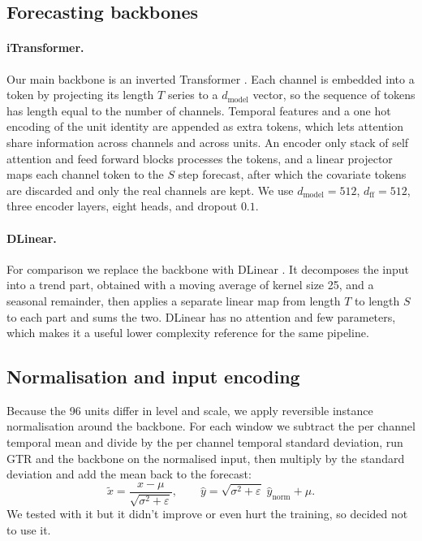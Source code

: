 \documentclass[11pt]{article}
\begin{document}
\subsection{Forecasting backbones}
\paragraph{iTransformer.} Our main backbone is an inverted Transformer
\cite{liu2024itransformer}. Each channel is embedded into a token by projecting its length $T$
series to a $d_{\text{model}}$ vector, so the sequence of tokens has length equal to the number
of channels. Temporal features and a one hot encoding of the unit identity are appended as
extra tokens, which lets attention share information across channels and across units. An
encoder only stack of self attention and feed forward blocks processes the tokens, and a linear
projector maps each channel token to the $S$ step forecast, after which the covariate tokens are
discarded and only the real channels are kept. We use $d_{\text{model}}=512$,
$d_{\text{ff}}=512$, three encoder layers, eight heads, and dropout $0.1$.

\paragraph{DLinear.} For comparison we replace the backbone with DLinear
\cite{zeng2023dlinear}. It decomposes the input into a trend part, obtained with a moving average
of kernel size 25, and a seasonal remainder, then applies a separate linear map from length $T$
to length $S$ to each part and sums the two. DLinear has no attention and few parameters, which
makes it a useful lower complexity reference for the same pipeline.

\subsection{Normalisation and input encoding}
Because the 96 units differ in level and scale, we apply reversible instance normalisation
\cite{kim2022revin} around the backbone. For each window we subtract the per channel temporal
mean and divide by the per channel temporal standard deviation, run GTR \cite{cao2026gtr} and the backbone on the
normalised input, then multiply by the standard deviation and add the mean back to the forecast:
\begin{equation}
\tilde{x} = \frac{x-\mu}{\sqrt{\sigma^{2}+\varepsilon}}, \qquad
\hat{y} = \sqrt{\sigma^{2}+\varepsilon}\;\hat{y}_{\text{norm}} + \mu .
\end{equation}
We tested with it but it didn't improve or even hurt the training, so decided not to use it.
\end{document}
